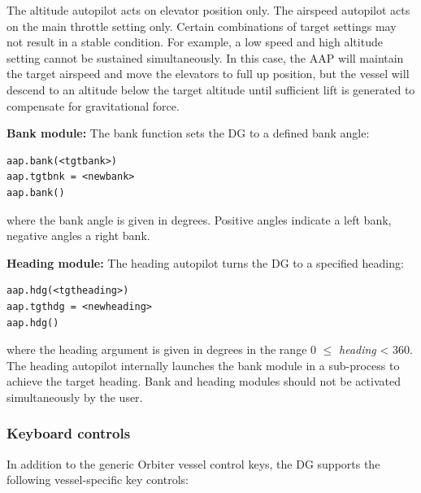 \documentclass[Orbiter User Manual.tex]{subfiles}
\begin{document}
The altitude autopilot acts on elevator position only. The airspeed autopilot
acts on the main throttle setting only. Certain combinations of target settings
may not result in a stable condition. For example, a low speed and high altitude
setting cannot be sustained simultaneously. In this case, the AAP will maintain
the target airspeed and move the elevators to full up position, but the vessel
will descend to an altitude below the target altitude until sufficient lift is
generated to compensate for gravitational force.

\textbf{Bank module:}
The bank function sets the DG to a defined bank angle:

\begin{lstlisting}[language=OSFS]
aap.bank(<tgtbank>)
aap.tgtbnk = <newbank>
aap.bank()
\end{lstlisting}

where the bank angle is given in degrees. Positive angles indicate a left bank,
negative angles a right bank.

\textbf{Heading module:}
The heading autopilot turns the DG to a specified heading:

\begin{lstlisting}[language=OSFS]
aap.hdg(<tgtheading>)
aap.tgthdg = <newheading>
aap.hdg()
\end{lstlisting}

where the heading argument is given in degrees in the range 0 $\leq$
\textit{heading} < 360. The heading autopilot internally launches the bank
module in a sub-process to achieve the target heading. Bank and heading modules
should not be activated simultaneously by the user.


\subsubsection{Keyboard controls}
In addition to the generic Orbiter vessel control keys, the DG supports the
following vessel-specific key controls:
\end{document}
